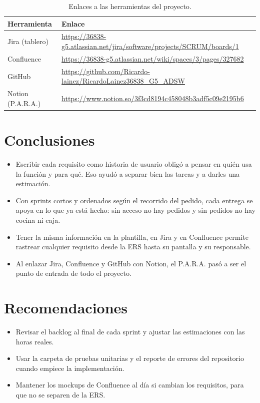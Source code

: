 \documentclass[a4paper, 11pt]{article}
\begin{document}
\begin{table}[H]
\centering
\small
\begin{tabular}{|p{3cm}|p{10.6cm}|}
\hline
\textbf{Herramienta} & \textbf{Enlace} \\ \hline
Jira (tablero) & \url{https://36838-g5.atlassian.net/jira/software/projects/SCRUM/boards/1} \\ \hline
Confluence & \url{https://36838-g5.atlassian.net/wiki/spaces/3/pages/327682} \\ \hline
GitHub & \url{https://github.com/Ricardo-lainez/RicardoLainez36838_G5_ADSW} \\ \hline
Notion (P.A.R.A.) & \url{https://www.notion.so/3f3cd8194c458048b3adf5c09e2195b6} \\ \hline
\end{tabular}
\caption{Enlaces a las herramientas del proyecto.}
\label{tab:links}
\end{table}

\section{Conclusiones}

\begin{itemize}
  \item Escribir cada requisito como historia de usuario obligó a pensar en quién usa la función y para qué. Eso ayudó a separar bien las tareas y a darles una estimación.
  \item Con sprints cortos y ordenados según el recorrido del pedido, cada entrega se apoya en lo que ya está hecho: sin acceso no hay pedidos y sin pedidos no hay cocina ni caja.
  \item Tener la misma información en la plantilla, en Jira y en Confluence permite rastrear cualquier requisito desde la ERS hasta su pantalla y su responsable.
  \item Al enlazar Jira, Confluence y GitHub con Notion, el P.A.R.A. pasó a ser el punto de entrada de todo el proyecto.
\end{itemize}

\section{Recomendaciones}

\begin{itemize}
  \item Revisar el backlog al final de cada sprint y ajustar las estimaciones con las horas reales.
  \item Usar la carpeta de pruebas unitarias y el reporte de errores del repositorio cuando empiece la implementación.
  \item Mantener los mockups de Confluence al día si cambian los requisitos, para que no se separen de la ERS.
\end{itemize}
\end{document}
